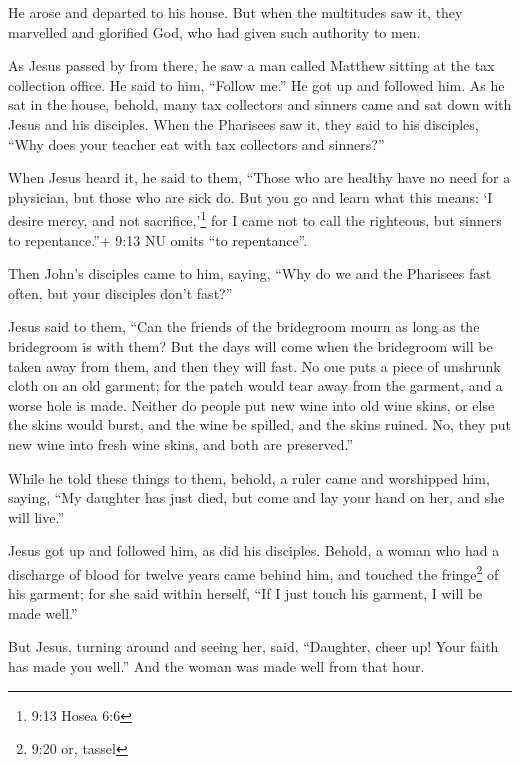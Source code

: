  He arose and departed to his house.  But when
the multitudes saw it, they marvelled and glorified God, who had given
such authority to men.

 As Jesus passed by from there, he saw a man called Matthew
sitting at the tax collection office. He said to him, ``Follow me.'' He
got up and followed him.  As he sat in the house, behold,
many tax collectors and sinners came and sat down with Jesus and his
disciples.  When the Pharisees saw it, they said to his
disciples, ``Why does your teacher eat with tax collectors and
sinners?''

 When Jesus heard it, he said to them, ``Those who are
healthy have no need for a physician, but those who are sick do.
 But you go and learn what this means: `I desire mercy, and
not sacrifice,'\footnote{9:13 Hosea 6:6} for I came not to call the
righteous, but sinners to repentance.''+ 9:13 NU omits ``to
repentance''.

 Then John's disciples came to him, saying, ``Why do we and
the Pharisees fast often, but your disciples don't fast?''

 Jesus said to them, ``Can the friends of the bridegroom
mourn as long as the bridegroom is with them? But the days will come
when the bridegroom will be taken away from them, and then they will
fast.  No one puts a piece of unshrunk cloth on an old
garment; for the patch would tear away from the garment, and a worse
hole is made.  Neither do people put new wine into old wine
skins, or else the skins would burst, and the wine be spilled, and the
skins ruined. No, they put new wine into fresh wine skins, and both are
preserved.''

 While he told these things to them, behold, a ruler came
and worshipped him, saying, ``My daughter has just died, but come and
lay your hand on her, and she will live.''

 Jesus got up and followed him, as did his disciples.
 Behold, a woman who had a discharge of blood for twelve
years came behind him, and touched the fringe\footnote{9:20 or, tassel}
of his garment;  for she said within herself, ``If I just
touch his garment, I will be made well.''

 But Jesus, turning around and seeing her, said,
``Daughter, cheer up! Your faith has made you well.'' And the woman was
made well from that hour.

